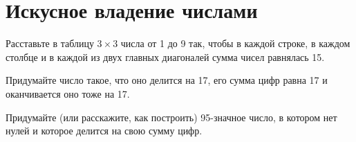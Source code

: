 \section{Искусное владение числами}
\begin{itemize}
\itA Расставьте в таблицу $3 \times 3$ числа от 1 до 9 так, чтобы в каждой строке, в каждом столбце и в каждой из двух главных диагоналей сумма чисел равнялась 15.

\itB Придумайте число такое, что оно делится на 17, его сумма цифр равна 17 и оканчивается оно тоже на 17.

\itC Придумайте (или расскажите, как построить) 95-значное число, в котором нет нулей и которое делится на свою сумму цифр.
\end{itemize}